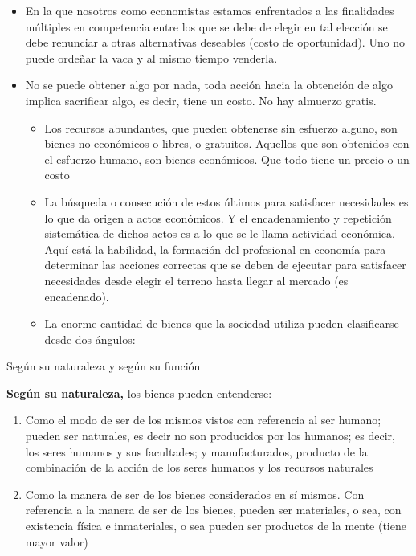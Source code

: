 \documentclass[
  a4paper,
]{article}
\providecommand{\tightlist}{%
  \setlength{\itemsep}{0pt}\setlength{\parskip}{0pt}}\usepackage{longtable,booktabs,array}
\begin{document}
\begin{itemize}
\tightlist
\item
  En la que nosotros como economistas estamos enfrentados a las
  finalidades múltiples en competencia entre los que se debe de elegir
  en tal elección se debe renunciar a otras alternativas deseables
  (costo de oportunidad). Uno no puede ordeñar la vaca y al mismo tiempo
  venderla.
\item
  No se puede obtener algo por nada, toda acción hacia la obtención de
  algo implica sacrificar algo, es decir, tiene un costo. No hay
  almuerzo gratis.

  \begin{itemize}
  \tightlist
  \item
    Los recursos abundantes, que pueden obtenerse sin esfuerzo alguno,
    son bienes no económicos o libres, o gratuitos. Aquellos que son
    obtenidos con el esfuerzo humano, son bienes económicos. Que todo
    tiene un precio o un costo
  \item
    La búsqueda o consecución de estos últimos para satisfacer
    necesidades es lo que da origen a actos económicos. Y el
    encadenamiento y repetición sistemática de dichos actos es a lo que
    se le llama actividad económica. Aquí está la habilidad, la
    formación del profesional en economía para determinar las acciones
    correctas que se deben de ejecutar para satisfacer necesidades desde
    elegir el terreno hasta llegar al mercado (es encadenado).
  \item
    La enorme cantidad de bienes que la sociedad utiliza pueden
    clasificarse desde dos ángulos:
  \end{itemize}
\end{itemize}

Según su naturaleza y según su función

\textbf{Según su naturaleza,} los bienes pueden entenderse:

\begin{enumerate}
\def\labelenumi{\arabic{enumi}.}
\item
  Como el modo de ser de los mismos vistos con referencia al ser humano;
  pueden ser naturales, es decir no son producidos por los humanos; es
  decir, los seres humanos y sus facultades; y manufacturados, producto
  de la combinación de la acción de los seres humanos y los recursos
  naturales
\item
  Como la manera de ser de los bienes considerados en sí mismos. Con
  referencia a la manera de ser de los bienes, pueden ser materiales, o
  sea, con existencia física e inmateriales, o sea pueden ser productos
  de la mente (tiene mayor valor)
\end{enumerate}
\end{document}
